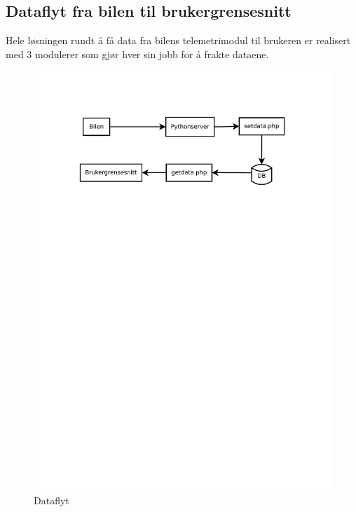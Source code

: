 \subsection{Dataflyt fra bilen til brukergrensesnitt}
Hele løsningen rundt å få data fra bilens telemetrimodul til brukeren er realisert med 3 modulerer som gjør hver sin jobb for å frakte dataene.
\begin{figure}[H]
\label{dataflow}
\includegraphics[width=\textwidth, trim=0 550 0 75]{images/dataflow.pdf}
\caption{Dataflyt} 
\end{figure}
